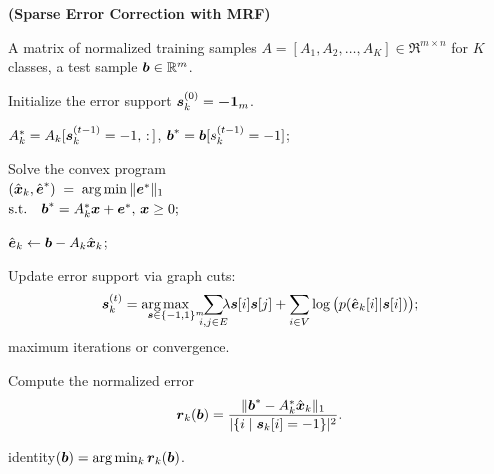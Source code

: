 \begin{algorithm}[h]
\caption{{\bf (Sparse Error Correction with MRF)}} \label{alg:p-mrf}
\begin{algorithmic}[1]
 A matrix of normalized training samples $A =
[A_1,A_2,\ldots,A_K] \in \Re^{m\times n}$ for $K$ classes, a test
sample $\boldsymbol{b} \in \mathbb R^{m}$.


\STATE Initialize the error support $\boldsymbol{s}^{(0)}_k = \boldsymbol{-1}_m$.


\STATE \hspace{3mm}$A_k^* = A_k[\boldsymbol{s}^{(t-1)}_k=-1,\, :\, ]$, $\boldsymbol{b}^* =
\boldsymbol{b}[s^{(t-1)}_k=-1]$;

\STATE \hspace{3mm}Solve the convex program\\
\hspace{5mm} $(\hat{{\boldsymbol{x}}}_k,\hat{\boldsymbol{e}}^*) \;=\; \arg\min \|\boldsymbol{e}^*\|_1 $\\
\hspace{24mm} $\mathrm{ s.t. } \quad \boldsymbol{b}^* = A_k^*{\boldsymbol{x}}+\boldsymbol{e}^*, \, {\boldsymbol{x}}\geq 0;$

\STATE \hspace{3mm}$\hat{\boldsymbol{e}}_k\leftarrow \boldsymbol{b}-A_k\hat{{\boldsymbol{x}}}_k$;

\STATE \hspace{3mm}Update error support via graph cuts:\vspace{0mm}
$$\s^{(t)}_k = \arg\hspace{-4mm}\max_{\s\in\{-1,1\}^m}\hspace{-2mm}\sum_{i,j\in
E}\hspace{-2mm}{\lambda} \s[i]\s[j]+\sum_{i\in
V}\log\big(p(\hat{\e}_k[i]|\s[i])\big);$$\vspace{0mm}
 maximum iterations or convergence.

\STATE Compute the normalized error $$\mathbf{r}_k(\bb) =
\frac{\|\bb^*-A_k^*\hat{\x}_k\|_1}{|\{ i \mid \s_k[i] = -1 \}|^2}. \vspace{0mm}$$
\ENDFOR

 identity$(\boldsymbol{b}) = \arg\min_k \boldsymbol{r}_k(\boldsymbol{b})$.
\end{algorithmic}
\end{algorithm}

